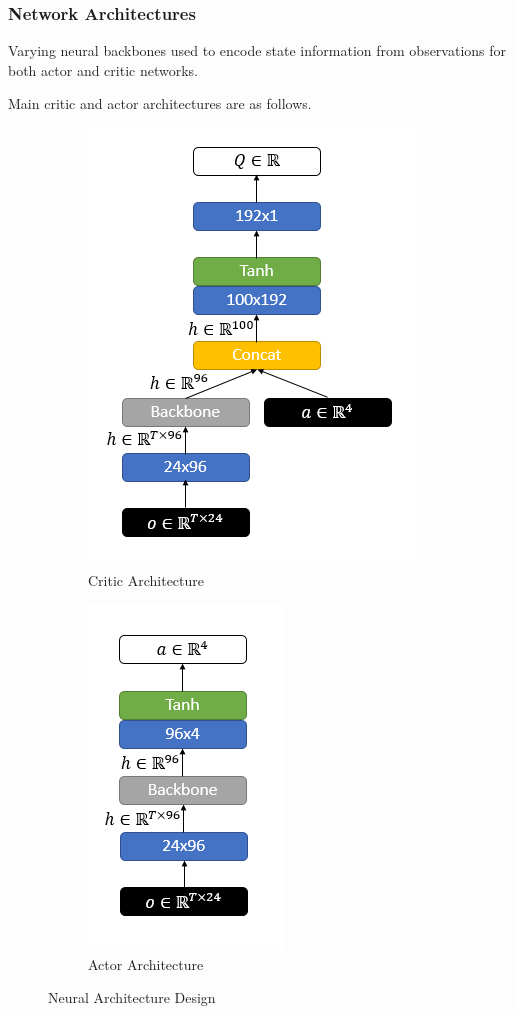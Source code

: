 \documentclass{beamer}
\begin{document}
\begin{frame}
\frametitle{Network Architectures}
Varying neural backbones used to encode state information from observations for both actor and critic networks. 

Main critic and actor architectures are as follows. 

\begin{figure}
	\begin{subfigure}{.45\textwidth}
		\centering
		\includegraphics[width=0.65\linewidth]{figures/nets/critic.png}
		\caption{Critic Architecture}
		\label{fig:critic_net}
	\end{subfigure}
	\begin{subfigure}{.45\textwidth}
		\centering
		\includegraphics[width=0.4\linewidth]{figures/nets/actor.png}
		\caption{Actor Architecture}
		\label{fig:actor_net}
	\end{subfigure}
	\caption{Neural Architecture Design}
	\label{fig:nets}
\end{figure}
\end{frame}
\end{document}
